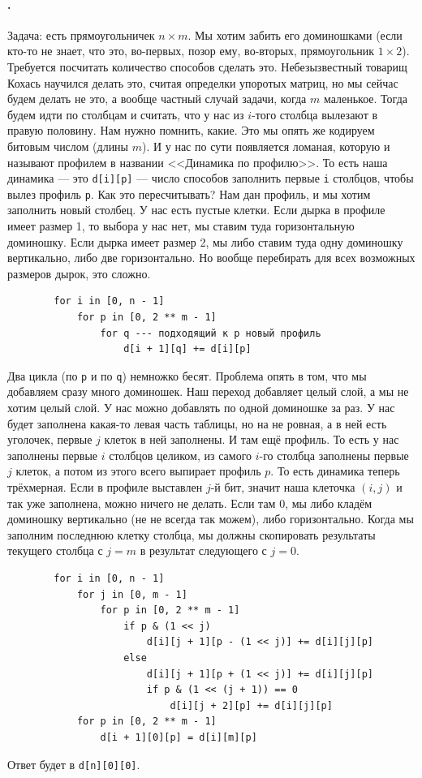 \documentclass{article}
\newcommand{\pseudo}{PseudoLexer.py:PseudoLexer -x}
\newcommand{\pseudocode}[1]{\texttt{#1}}
\begin{document}
    \paragraph{.}
    Задача: есть прямоугольничек $n\times m$. Мы хотим забить его доминошками (если кто-то не знает, что это, во-первых, позор ему, во-вторых, прямоугольник $1\times2$). Требуется посчитать количество способов сделать это. Небезызвестный товарищ Кохась научился делать это, считая определки упоротых матриц, но мы сейчас будем делать не это, а вообще частный случай задачи, когда $m$ маленькое. Тогда будем идти по столбцам и считать, что у нас из $i$-того столбца вылезают в правую половину. Нам нужно помнить, какие. Это мы опять же кодируем битовым числом (длины $m$). И у нас по сути появляется ломаная, которую и называют профилем в названии <<Динамика по профилю>>. То есть наша динамика --- это \pseudocode{d[i][p]} --- число способов заполнить первые \pseudocode{i} столбцов, чтобы вылез профиль \pseudocode{p}. Как это пересчитывать? Нам дан профиль, и мы хотим заполнить новый столбец. У нас есть пустые клетки. Если дырка в профиле имеет размер 1, то выбора у нас нет, мы ставим туда горизонтальную доминошку.  Если дырка имеет размер 2, мы либо ставим туда одну доминошку вертикально, либо две горизонтально. Но вообще перебирать для всех возможных размеров дырок, это сложно.
    \begin{verbatim}
        for i in [0, n - 1]
            for p in [0, 2 ** m - 1]
                for q --- подходящий к р новый профиль
                    d[i + 1][q] += d[i][p]
    \end{verbatim}
    Два цикла (по \pseudocode{p} и по \pseudocode{q}) немножко бесят. Проблема опять в том, что мы добавляем сразу много доминошек. Наш переход добавляет целый слой, а мы не хотим целый слой. У нас можно добавлять по одной доминошке за раз. У нас будет заполнена какая-то левая часть таблицы, но на не ровная, а в ней есть уголочек, первые $j$ клеток в ней заполнены. И там ещё профиль. То есть у нас заполнены первые $i$ столбцов целиком, из самого $i$-го столбца заполнены первые $j$ клеток, а потом из этого всего выпирает профиль $p$. То есть динамика теперь трёхмерная. Если в профиле выставлен $j$-й бит, значит наша клеточка $(i,j)$ и так уже заполнена, можно ничего не делать. Если там 0, мы либо кладём доминошку вертикально (не не всегда так можем), либо горизонтально. Когда мы заполним последнюю клетку столбца, мы должны скопировать результаты текущего столбца с $j=m$ в результат следующего с $j=0$.
    \begin{verbatim}
        for i in [0, n - 1]
            for j in [0, m - 1]
                for p in [0, 2 ** m - 1]
                    if p & (1 << j)
                        d[i][j + 1][p - (1 << j)] += d[i][j][p]
                    else
                        d[i][j + 1][p + (1 << j)] += d[i][j][p]
                        if p & (1 << (j + 1)) == 0
                            d[i][j + 2][p] += d[i][j][p]
            for p in [0, 2 ** m - 1]
                d[i + 1][0][p] = d[i][m][p]
    \end{verbatim}
    Ответ будет в \pseudocode{d[n][0][0]}.
\end{document}
